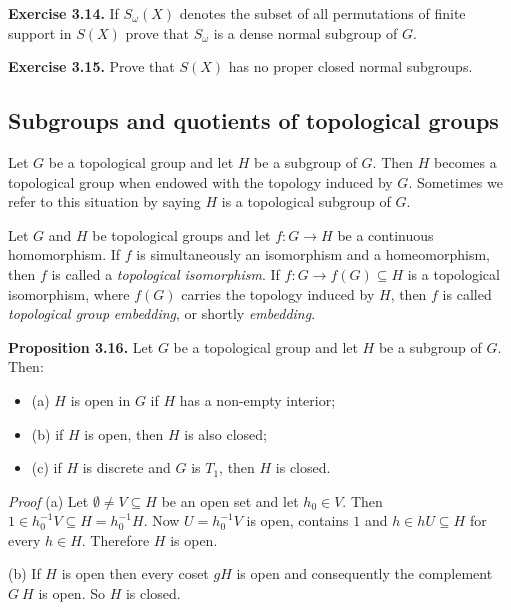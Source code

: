 \documentclass[12pt]{article}
\begin{document}
    \textbf{Exercise 3.14.} If $S_\omega (X)$ denotes the subset of all permutations of finite support in $S(X)$ prove that $S_\omega$ is a
    dense normal subgroup of $G$.


    \textbf{Exercise 3.15.} Prove that $S(X)$ has no proper closed normal subgroups.


    \subsection{Subgroups and quotients of topological groups}


        Let $G$ be a topological group and let $H$ be a subgroup of $G$. Then $H$ becomes a topological group when endowed
    with the topology induced by $G$. Sometimes we refer to this situation by saying $H$ is a topological subgroup of
    $G$.


        Let $G$ and $H$ be topological groups and let $f : G \to H$ be a continuous homomorphism. If $f$ is simultaneously
    an isomorphism and a homeomorphism, then $f$ is called a \emph{topological isomorphism}. If $f : G \to f(G) \subseteq H$ is
    a topological isomorphism, where $f(G)$ carries the topology induced by $H$, then $f$ is called \emph{topological group}
    \emph{embedding}, or shortly \emph{embedding}.


    \textbf{Proposition 3.16.} Let $G$ be a topological group and let $H$ be a subgroup of $G$. Then:


        \begin{itemize}
            \item (a) $H$ is open in $G$ if $H$ has a non-empty interior;

            \item (b) if $H$ is open, then $H$ is also closed;
            
            \item (c) if $H$ is discrete and $G$ is $T_1$, then $H$ is closed.
        \end{itemize}  


        \emph{Proof} (a) Let $\emptyset \neq V \subseteq H$ be an open set and let $h_0 \in V$. Then $1 \in h^{-1}_0 V \subseteq H = h^{-1}_0 H$. Now $U = h^{-1}_0 V$ is
        open, contains $1$ and $h \in hU \subseteq H$ for every $h \in H$. Therefore $H$ is open.


        (b) If $H$ is open then every coset $gH$ is open and consequently the complement $G \ H$ is open. So $H$ is
            closed.
\end{document}
